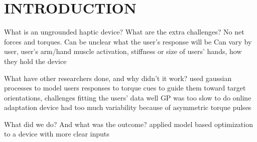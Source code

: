 \section{INTRODUCTION}

\begin{outline}
    \1 What is an ungrounded haptic device? 
    \1 What are the extra challenges?
    \2 No net forces and torques.
    \2 Can be unclear what the user's response will be
    \2 Can vary by user, user's arm/hand muscle activation, stiffness or size of users' hands, how they hold the device
    
    \1 What have other researchers done, and why didn't it work? 
    \2 \cite{Walker2017} used gaussian processes to model users responses to torque cues to guide them toward target orientations, challenges fitting the users' data well
    \2 GP was too slow to do online adaptation
    \2 device had too much variability because of asymmetric torque pulses
    
    \1 What did we do? And what was the outcome? 
    \2 applied model based optimization to a device with more clear inputs
\end{outline}